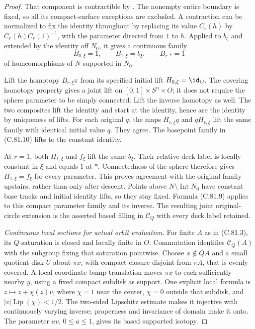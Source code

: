 \begin{proof}
That component is contractible by
\cite[Lemma~2.1(ii)]{C_Yagasaki2000}.
The nonempty entire boundary is fixed, so
all its compact-surface exceptions are excluded.
A contraction can be normalized to fix the
identity throughout by replacing its value
$C_r(h)$ by $C_r(h)C_r(1)^{-1}$, with the
parameter directed from $1$ to $h$.
Applied to $b_\xi$ and extended by the identity
off $N_0$, it gives a continuous family
\[
 B_{0,\xi}=1,\qquad B_{1,\xi}=b_\xi,
                         \qquad B_{r,*}=1
                                                               \tag{C.81.10}
\]
of homeomorphisms of $N$ supported in $N_0$.

Lift the homotopy $B_{r,\xi}\pi$ from its
specified initial lift $H_{0,\xi}=\id_O$.
The covering homotopy property gives a joint
lift on $[0,1]\times S^n\times O$; it does
not require the sphere parameter to be simply
connected. Lift the inverse homotopy as well.
The two composites lift the identity and
start at the identity, hence are the identity
by uniqueness of lifts. For each original
$q$, the maps $H_{r,\xi}q$ and $qH_{r,\xi}$
lift the same family with identical initial
value $q$. They agree. The basepoint family
in (C.81.10) lifts to the constant identity.

At $r=1$, both $H_{1,\xi}$ and $f_\xi$ lift
the same $b_\xi$. Their relative deck label
is locally constant in $\xi$ and equals $1$
at $*$. Connectedness of the sphere therefore
gives $H_{1,\xi}=f_\xi$ for every parameter.
This proves agreement with the original
family upstairs, rather than only after
descent. Points above $N\setminus\operatorname{Int}N_0$
have constant base tracks and initial identity
lifts, so they stay fixed. Formula (C.81.9)
applies to this compact parameter family and
its inverse. The resulting joint original-circle
extension is the asserted based filling in
$\mathscr C_Q$ with every deck label retained.

\emph{Continuous local sections for actual orbit evaluation.}
For finite $A$ as in (C.81.3), its $Q$-saturation
is closed and locally finite in $O$. Commutation
identifies $\mathscr C_Q(A)$ with the subgroup
fixing that saturation pointwise. Choose
$x\notin QA$ and a small quotient disk $U$
about $\pi x$, with compact closure disjoint
from $\pi A$, that is evenly covered.
A local coordinate bump translation moves
$\pi x$ to each sufficiently nearby $y$,
using a fixed compact subdisk as support.
One explicit local formula is
$z\mapsto z+\chi(z)v$, where $\chi=1$ near
the center, $\chi=0$ outside that subdisk,
and $|v|\operatorname{Lip}(\chi)<1/2$.
The two-sided Lipschitz estimate makes it
injective with continuously varying inverse;
properness and invariance of domain make
it onto. The parameter $av$, $0\leq a\leq1$,
gives its based supported isotopy.


\end{proof}
